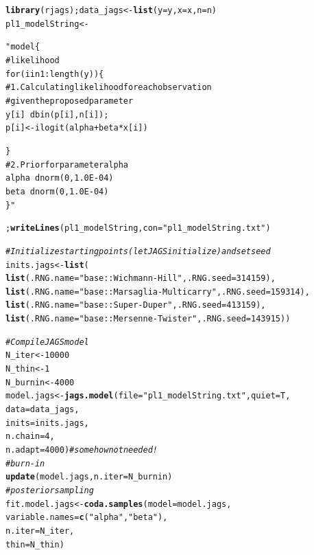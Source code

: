 \documentclass{article}\usepackage[]{graphicx}\usepackage[]{xcolor}
\makeatletter
\newcommand{\hlnum}[1]{\textcolor[rgb]{0.686,0.059,0.569}{#1}}%
\newcommand{\hlstr}[1]{\textcolor[rgb]{0.192,0.494,0.8}{#1}}%
\newcommand{\hlcom}[1]{\textcolor[rgb]{0.678,0.584,0.686}{\textit{#1}}}%
\newcommand{\hlstd}[1]{\textcolor[rgb]{0.345,0.345,0.345}{#1}}%
\newcommand{\hlkwb}[1]{\textcolor[rgb]{0.69,0.353,0.396}{#1}}%
\newcommand{\hlkwc}[1]{\textcolor[rgb]{0.333,0.667,0.333}{#1}}%
\newcommand{\hlkwd}[1]{\textcolor[rgb]{0.737,0.353,0.396}{\textbf{#1}}}%
\newenvironment{kframe}{%
 \def\at@end@of@kframe{}%
 \ifinner\ifhmode%
  \def\at@end@of@kframe{\end{minipage}}%
  \begin{minipage}{\columnwidth}%
 \fi\fi%
 \def\FrameCommand##1{\hskip\@totalleftmargin \hskip-\fboxsep
 \colorbox{shadecolor}{##1}\hskip-\fboxsep
     \hskip-\linewidth \hskip-\@totalleftmargin \hskip\columnwidth}%
 \MakeFramed {\advance\hsize-\width
   \@totalleftmargin\z@ \linewidth\hsize
   \@setminipage}}%
 {\par\unskip\endMakeFramed%
 \at@end@of@kframe}
\newenvironment{knitrout}{}{} %
\makeatother
\begin{document}
\begin{multicols*}{2}
\tiny
\begin{knitrout}
\color{fgcolor}\begin{kframe}
\begin{alltt}
\hlkwd{library}\hlstd{(rjags); data_jags} \hlkwb{<-} \hlkwd{list}\hlstd{(}\hlkwc{y}\hlstd{=y,} \hlkwc{x}\hlstd{=x,} \hlkwc{n}\hlstd{=n)}
\hlstd{pl1_modelString} \hlkwb{<-} \hlstr{"model\{
  # likelihood
  for (i in 1:length(y))\{ 
  # 1. Calculating likelihood for each observation
  #    given the proposed parameter
	y[i] ~ dbin(p[i],n[i]);
	p[i] <- ilogit(alpha + beta * x[i])
	
  \}
  # 2. Prior for parameter alpha
  alpha ~ dnorm(0, 1.0E-04)
  beta  ~ dnorm(0, 1.0E-04)
\}"}\hlstd{;} \hlkwd{writeLines}\hlstd{(pl1_modelString,} \hlkwc{con} \hlstd{=} \hlstr{"pl1_modelString.txt"}\hlstd{)}
\end{alltt}
\end{kframe}
\end{knitrout}

\begin{knitrout}
\color{fgcolor}\begin{kframe}
\begin{alltt}
\hlcom{# Initialize starting points (let JAGS initialize) and set seed}
\hlstd{inits.jags} \hlkwb{<-} \hlkwd{list}\hlstd{(}
  \hlkwd{list}\hlstd{(}\hlkwc{.RNG.name}\hlstd{=}\hlstr{"base::Wichmann-Hill"}\hlstd{,} \hlkwc{.RNG.seed}\hlstd{=}\hlnum{314159}\hlstd{),}
  \hlkwd{list}\hlstd{(}\hlkwc{.RNG.name}\hlstd{=}\hlstr{"base::Marsaglia-Multicarry"}\hlstd{,} \hlkwc{.RNG.seed}\hlstd{=}\hlnum{159314}\hlstd{),}
  \hlkwd{list}\hlstd{(}\hlkwc{.RNG.name}\hlstd{=}\hlstr{"base::Super-Duper"}\hlstd{,} \hlkwc{.RNG.seed}\hlstd{=}\hlnum{413159}\hlstd{),}
  \hlkwd{list}\hlstd{(}\hlkwc{.RNG.name}\hlstd{=}\hlstr{"base::Mersenne-Twister"}\hlstd{,} \hlkwc{.RNG.seed}\hlstd{=}\hlnum{143915}\hlstd{))}

\hlcom{# Compile JAGS model}
\hlstd{N_iter} \hlkwb{<-} \hlnum{10000}
\hlstd{N_thin} \hlkwb{<-} \hlnum{1}
\hlstd{N_burnin} \hlkwb{<-} \hlnum{4000}
\hlstd{model.jags} \hlkwb{<-} \hlkwd{jags.model}\hlstd{(}\hlkwc{file} \hlstd{=} \hlstr{"pl1_modelString.txt"}\hlstd{,}\hlkwc{quiet}\hlstd{=T,}
                          \hlkwc{data} \hlstd{= data_jags,}
                          \hlkwc{inits} \hlstd{= inits.jags,}
                          \hlkwc{n.chain} \hlstd{=} \hlnum{4}\hlstd{,}
                          \hlkwc{n.adapt} \hlstd{=} \hlnum{4000}\hlstd{)}\hlcom{#somehow not needed!}
\hlcom{# burn-in}
\hlkwd{update}\hlstd{(model.jags,} \hlkwc{n.iter} \hlstd{= N_burnin)}
\hlcom{# posterior sampling}
\hlstd{fit.model.jags} \hlkwb{<-} \hlkwd{coda.samples}\hlstd{(}\hlkwc{model} \hlstd{= model.jags,}
                                \hlkwc{variable.names} \hlstd{=} \hlkwd{c}\hlstd{(}\hlstr{"alpha"}\hlstd{,}\hlstr{"beta"}\hlstd{),}
                                \hlkwc{n.iter} \hlstd{= N_iter,}
                                \hlkwc{thin} \hlstd{= N_thin)}
\end{alltt}
\end{kframe}
\end{knitrout}


\end{multicols*}
\end{document}
